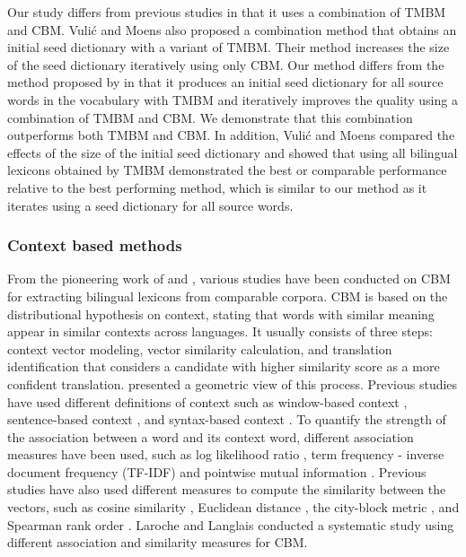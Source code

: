 \documentclass[english]{jnlp_1.4}
\begin{document}
Our study differs from previous studies in that it uses a combination of TMBM and CBM.
Vuli\'{c} and Moens \citeyear{vulic-moens:2013:EMNLP} also proposed
a combination method that obtains an initial seed dictionary with a variant of TMBM.
Their method increases the size of the seed dictionary iteratively using only CBM.
Our method differs from the method proposed by \cite{vulic-moens:2013:EMNLP} in
that it produces an initial seed dictionary for all source words in the vocabulary with TMBM
and iteratively improves the quality using a combination of TMBM and CBM. 
We demonstrate that this combination outperforms both TMBM and CBM. In addition, 
Vuli\'{c} and Moens \citeyear{vulic-moens:2013:EMNLP} compared the effects
of the size of the initial seed dictionary and showed that using all bilingual 
lexicons obtained by TMBM demonstrated the best or comparable performance relative to the best performing
method, which is similar to our method as it iterates using a seed dictionary for all source words.


\subsubsection{Context based methods}

From the pioneering work of \cite{rapp:1995:ACL} and \cite{fung:1995},
various studies have been conducted on CBM for
extracting bilingual lexicons from comparable corpora. CBM
is based on the distributional hypothesis on context, stating
that words with similar meaning appear in similar contexts across
languages. It usually consists of three steps: context vector modeling,
vector similarity calculation, and translation identification that
considers a candidate with higher similarity score as a more confident
translation.  presented a geometric view of this process.
Previous studies have used different definitions of context
such as window-based context
\cite{fung:1995,rapp:1999:ACL,koehn-knight:2002:ACL02-ULA,haghighi-EtAl:2008:ACLMain,prochasson-fung:2011:ACL-HLT2011,tamura-watanabe-sumita:2012:EMNLP-CoNLL},
sentence-based context \cite{fung-yee:1998:ACLCOLING}, and
syntax-based context
\cite{garera-callisonburch-yarowsky:2009:CoNLL,yu-tsujii:2009:NAACLHLT09-Short,qian-EtAl:2012:PAPERS}. 
To quantify the strength of the association between a word and its context word,
different association measures have been used, such as log likelihood ratio
\cite{rapp:1999:ACL}, term frequency - inverse document
frequency (TF-IDF) \cite{fung-yee:1998:ACLCOLING} and pointwise mutual information \cite{andrade-nasukawa-tsujii:2010:PAPERS}.
Previous studies have also used different measures to compute the
similarity between the vectors, such as cosine similarity
\cite{fung-yee:1998:ACLCOLING,garera-callisonburch-yarowsky:2009:CoNLL,prochasson-fung:2011:ACL-HLT2011,tamura-watanabe-sumita:2012:EMNLP-CoNLL},
Euclidean distance \cite{fung:1995,yu-tsujii:2009:NAACLHLT09-Short},
the city-block metric \cite{rapp:1999:ACL}, and
Spearman rank order \cite{koehn-knight:2002:ACL02-ULA}.
Laroche and Langlais \citeyear{laroche-langlais:2010:PAPERS} conducted a systematic study 
using different association and similarity measures for CBM.
\end{document}
